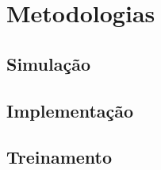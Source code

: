 \chapter{Metodologias}

\lipsum[1]

\section{Simula{\c c}{\~a}o}

\lipsum[2-3]

\section{Implementa{\c c}{\~a}o}

\lipsum[4-6]

\section{Treinamento}

\lipsum[7-8]

